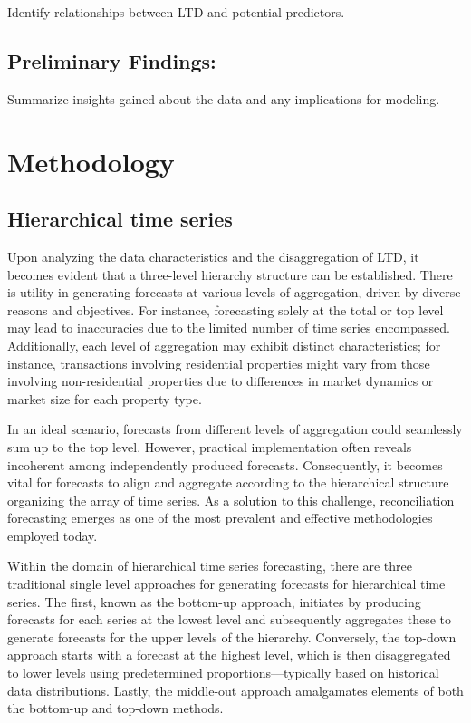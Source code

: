 \documentclass[11pt,a4paper,]{article}
\begin{document}
Identify relationships between LTD and potential predictors.

\subsection{Preliminary Findings:}\label{preliminary-findings}

Summarize insights gained about the data and any implications for modeling.

\section{Methodology}\label{methodology}

\subsection{Hierarchical time series}\label{hierarchical-time-series}

Upon analyzing the data characteristics and the disaggregation of LTD, it becomes evident that a three-level hierarchy structure can be established. There is utility in generating forecasts at various levels of aggregation, driven by diverse reasons and objectives. For instance, forecasting solely at the total or top level may lead to inaccuracies due to the limited number of time series encompassed. Additionally, each level of aggregation may exhibit distinct characteristics; for instance, transactions involving residential properties might vary from those involving non-residential properties due to differences in market dynamics or market size for each property type.

In an ideal scenario, forecasts from different levels of aggregation could seamlessly sum up to the top level. However, practical implementation often reveals incoherent among independently produced forecasts. Consequently, it becomes vital for forecasts to align and aggregate according to the hierarchical structure organizing the array of time series. As a solution to this challenge, reconciliation forecasting emerges as one of the most prevalent and effective methodologies employed today.

Within the domain of hierarchical time series forecasting, there are three traditional single level approaches for generating forecasts for hierarchical time series. The first, known as the bottom-up approach, initiates by producing forecasts for each series at the lowest level and subsequently aggregates these to generate forecasts for the upper levels of the hierarchy. Conversely, the top-down approach starts with a forecast at the highest level, which is then disaggregated to lower levels using predetermined proportions---typically based on historical data distributions. Lastly, the middle-out approach amalgamates elements of both the bottom-up and top-down methods.
\end{document}
